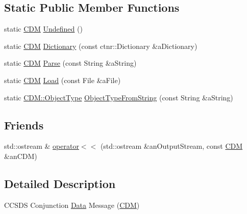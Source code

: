 \subsection*{Static Public Member Functions}
\begin{DoxyCompactItemize}
\item 
static \hyperlink{classostk_1_1astro_1_1conjunction_1_1messages_1_1ccsds_1_1_c_d_m}{C\+DM} \hyperlink{classostk_1_1astro_1_1conjunction_1_1messages_1_1ccsds_1_1_c_d_m_ad4bfbcaaa89c1d3d83a42eda836b4068}{Undefined} ()
\item 
static \hyperlink{classostk_1_1astro_1_1conjunction_1_1messages_1_1ccsds_1_1_c_d_m}{C\+DM} \hyperlink{classostk_1_1astro_1_1conjunction_1_1messages_1_1ccsds_1_1_c_d_m_ac7cef63b8d05b25f645498278e46c8d6}{Dictionary} (const ctnr\+::\+Dictionary \&a\+Dictionary)
\item 
static \hyperlink{classostk_1_1astro_1_1conjunction_1_1messages_1_1ccsds_1_1_c_d_m}{C\+DM} \hyperlink{classostk_1_1astro_1_1conjunction_1_1messages_1_1ccsds_1_1_c_d_m_a6b1d12654994bb2b1bc9d3a679ff765a}{Parse} (const String \&a\+String)
\item 
static \hyperlink{classostk_1_1astro_1_1conjunction_1_1messages_1_1ccsds_1_1_c_d_m}{C\+DM} \hyperlink{classostk_1_1astro_1_1conjunction_1_1messages_1_1ccsds_1_1_c_d_m_a2a696b242f9e21c81549183cd921379c}{Load} (const File \&a\+File)
\item 
static \hyperlink{classostk_1_1astro_1_1conjunction_1_1messages_1_1ccsds_1_1_c_d_m_a9ef446f2327904fc0516249120ec9d71}{C\+D\+M\+::\+Object\+Type} \hyperlink{classostk_1_1astro_1_1conjunction_1_1messages_1_1ccsds_1_1_c_d_m_aa36004f5a58ca60e4815aa1c286013ce}{Object\+Type\+From\+String} (const String \&a\+String)
\end{DoxyCompactItemize}
\subsection*{Friends}
\begin{DoxyCompactItemize}
\item 
std\+::ostream \& \hyperlink{classostk_1_1astro_1_1conjunction_1_1messages_1_1ccsds_1_1_c_d_m_ab7d7c6540081780b8224959e4bf0532e}{operator$<$$<$} (std\+::ostream \&an\+Output\+Stream, const \hyperlink{classostk_1_1astro_1_1conjunction_1_1messages_1_1ccsds_1_1_c_d_m}{C\+DM} \&an\+C\+DM)
\end{DoxyCompactItemize}


\subsection{Detailed Description}
C\+C\+S\+DS Conjunction \hyperlink{structostk_1_1astro_1_1conjunction_1_1messages_1_1ccsds_1_1_c_d_m_1_1_data}{Data} Message (\hyperlink{classostk_1_1astro_1_1conjunction_1_1messages_1_1ccsds_1_1_c_d_m}{C\+DM}) 

